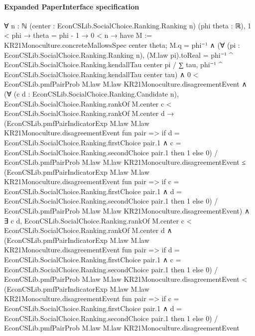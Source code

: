 \documentclass[10pt]{article}
\begin{document}
\paragraph{Expanded PaperInterface specification}
\begin{ReviewVerbatim}
∀ {n : ℕ} (center : EconCSLib.SocialChoice.Ranking.Ranking n) (phi theta : ℝ),
  1 < phi →
    theta = phi - 1 →
      0 < n →
        have M := KR21Monoculture.concreteMallowsSpec center theta;
        M.q = phi⁻¹ ∧
          (∀ (pi : EconCSLib.SocialChoice.Ranking.Ranking n),
              (M.law pi).toReal =
                phi⁻¹ ^ EconCSLib.SocialChoice.Ranking.kendallTau center pi /
                  ∑ tau, phi⁻¹ ^ EconCSLib.SocialChoice.Ranking.kendallTau center tau) ∧
            0 < EconCSLib.pmfPairProb M.law M.law KR21Monoculture.disagreementEvent ∧
              (∀ (c d : EconCSLib.SocialChoice.Ranking.Candidate n),
                  EconCSLib.SocialChoice.Ranking.rankOf M.center c < EconCSLib.SocialChoice.Ranking.rankOf M.center d →
                    (EconCSLib.pmfPairIndicatorExp M.law M.law KR21Monoculture.disagreementEvent fun pair =>
                          if
                              d = EconCSLib.SocialChoice.Ranking.firstChoice pair.1 ∧
                                c = EconCSLib.SocialChoice.Ranking.secondChoice pair.1 then
                            1
                          else 0) /
                        EconCSLib.pmfPairProb M.law M.law KR21Monoculture.disagreementEvent ≤
                      (EconCSLib.pmfPairIndicatorExp M.law M.law KR21Monoculture.disagreementEvent fun pair =>
                          if
                              c = EconCSLib.SocialChoice.Ranking.firstChoice pair.1 ∧
                                d = EconCSLib.SocialChoice.Ranking.secondChoice pair.1 then
                            1
                          else 0) /
                        EconCSLib.pmfPairProb M.law M.law KR21Monoculture.disagreementEvent) ∧
                ∃ c d,
                  EconCSLib.SocialChoice.Ranking.rankOf M.center c < EconCSLib.SocialChoice.Ranking.rankOf M.center d ∧
                    (EconCSLib.pmfPairIndicatorExp M.law M.law KR21Monoculture.disagreementEvent fun pair =>
                          if
                              d = EconCSLib.SocialChoice.Ranking.firstChoice pair.1 ∧
                                c = EconCSLib.SocialChoice.Ranking.secondChoice pair.1 then
                            1
                          else 0) /
                        EconCSLib.pmfPairProb M.law M.law KR21Monoculture.disagreementEvent <
                      (EconCSLib.pmfPairIndicatorExp M.law M.law KR21Monoculture.disagreementEvent fun pair =>
                          if
                              c = EconCSLib.SocialChoice.Ranking.firstChoice pair.1 ∧
                                d = EconCSLib.SocialChoice.Ranking.secondChoice pair.1 then
                            1
                          else 0) /
                        EconCSLib.pmfPairProb M.law M.law KR21Monoculture.disagreementEvent
\end{ReviewVerbatim}
\end{document}
